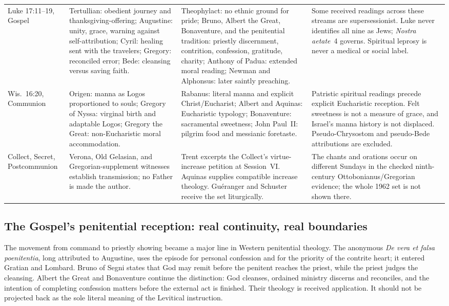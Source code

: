 \begin{longtable}{>{\raggedright\arraybackslash}p{}>{\raggedright\arraybackslash}p{}>{\raggedright\arraybackslash}p{}>{\raggedright\arraybackslash}p{}}
\addlinespace
Luke 17:11--19, Gospel & Tertullian: obedient journey and thanksgiving-offering; Augustine: unity, grace, warning against self-attribution; Cyril: healing sent with the travelers; Gregory: reconciled error; Bede: cleansing versus saving faith. & Theophylact: no ethnic ground for pride; Bruno, Albert the Great, Bonaventure, and the penitential tradition: priestly discernment, contrition, confession, gratitude, charity; Anthony of Padua: extended moral reading; Newman and Alphonsus: later saintly preaching. & Some received readings across these streams are supersessionist. Luke never identifies all nine as Jews; \emph{Nostra aetate}~4 governs. Spiritual leprosy is never a medical or social label.\\
\addlinespace
Wis.~16:20, Communion & Origen: manna as Logos proportioned to souls; Gregory of Nyssa: virginal birth and adaptable Logos; Gregory the Great: non-Eucharistic moral accommodation. & Rabanus: literal manna and explicit Christ/Eucharist; Albert and Aquinas: Eucharistic typology; Bonaventure: sacramental sweetness; John Paul~II: pilgrim food and messianic foretaste. & Patristic spiritual readings precede explicit Eucharistic reception. Felt sweetness is not a measure of grace, and Israel's manna history is not displaced. Pseudo-Chrysostom and pseudo-Bede attributions are excluded.\\
\addlinespace
Collect, Secret, Postcommunion & Verona, Old Gelasian, and Gregorian-supplement witnesses establish transmission; no Father is made the author. & Trent excerpts the Collect's virtue-increase petition at Session~VI. Aquinas supplies compatible increase theology. Guéranger and Schuster receive the set liturgically. & The chants and orations occur on different Sundays in the checked ninth-century Ottobonianus/Gregorian evidence; the whole 1962 set is not shown there.\\
\bottomrule
\end{longtable}

\subsection*{The Gospel's penitential reception: real continuity, real boundaries}

The movement from command to priestly showing became a major line in Western
penitential theology. The anonymous \emph{De vera et falsa poenitentia}, long
attributed to Augustine, uses the episode for personal confession and for the
priority of the contrite heart; it entered Gratian and Lombard. Bruno of Segni
states that God may remit before the penitent reaches the priest, while the
priest judges the cleansing. Albert the Great and Bonaventure continue the
distinction: God cleanses, ordained ministry discerns and reconciles, and the
intention of completing confession matters before the external act is
finished. Their theology is received application. It should not be projected
back as the sole literal meaning of the Levitical instruction.

